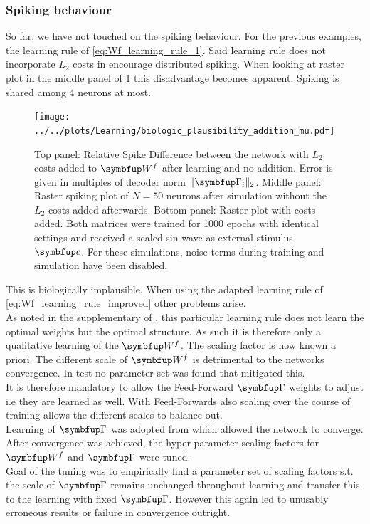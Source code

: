 \subsubsection{Spiking behaviour}
So far, we have not touched on the spiking behaviour. For the previous examples, the learning rule of \cref{eq:Wf_learning_rule_1}. Said learning rule does not incorporate $L_2$ costs in encourage distributed spiking.
When looking at raster plot in the middle panel of \cref{fig:Wf_learned_spikes} this disadvantage becomes apparent. Spiking is shared among 4 neurons at most.
\begin{figure}
	\centering
	\texttt{[image: ../../plots/Learning/biologic\_plausibility\_addition\_mu.pdf]}
	\caption{Top panel: Relative Spike Difference between the network with $L_2$ costs added to $\bmu{W}^f$ after learning and no addition. Error is given in multiples of decoder norm $\|\bmu{\Gamma}_i\|_2$. Middle panel: Raster spiking plot of $N=50$ neurons after simulation without the $L_2$ costs added afterwards. Bottom panel: Raster plot with costs added. Both matrices were trained for 1000 epochs with identical settings and received a scaled sin wave as external stimulus $\bmu{c}$. For these simulations, noise terms during training and simulation have been disabled.}
	\label{fig:Wf_learned_spikes}
\end{figure}
This is biologically implausible. When using the adapted learning rule of \cref{eq:Wf_learning_rule_improved} other problems arise.\\
As noted in the supplementary of \cite{brendel_learning_2020}, this particular learning rule does not learn the optimal weights but the optimal structure. As such it is therefore only a qualitative learning of the $\bmu{W}^f$. The scaling factor is now known a priori. The different scale of $\bmu{W}^f$ is detrimental to the networks convergence. In test no parameter set was found that mitigated this.\\
It is therefore mandatory to allow the Feed-Forward $\bmu{\Gamma}$ weights to adjust i.e they are learned as well. With Feed-Forwards also scaling over the course of training allows the different scales to balance out.\\
Learning of $\bmu{\Gamma}$ was adopted from \cite{brendel_learning_2020} which allowed the network to converge.\\
After convergence was achieved, the hyper-parameter scaling factors for $\bmu{W}^f$ and $\bmu{\Gamma}$ were tuned.\\
Goal of the tuning was to empirically find a parameter set of scaling factors s.t. the scale of $\bmu{\Gamma}$ remains unchanged throughout learning and transfer this to the learning with fixed $\bmu{\Gamma}$. However this again led to unusably erroneous results or failure in convergence outright.\\
